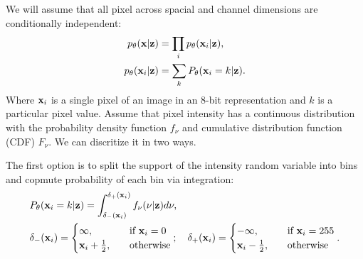 We will assume that all pixel across spacial and channel dimensions are conditionally independent:
\begin{align}
    p_{\theta}({\mathbf{x}}|{\mathbf{z}}) &= \prod_i p_{\theta}({\mathbf{x}}_i|{\mathbf{z}}),\\
    p_{\theta}({\mathbf{x}}_i|{\mathbf{z}}) &= \sum_{k} P_{\theta}({\mathbf{x}}_i = k|{\mathbf{z}}).
\end{align}
Where ${\mathbf{x}}_i$ is a single pixel of an image in an 8-bit representation and $k$ is a particular pixel value. 
Assume that pixel intensity has a continuous distribution with the probability density function $f_{\nu}$ and cumulative distribution function (CDF) $F_{\nu}$. We can discritize it in two ways. 

The first option is to split the support of the intensity random variable into bins and copmute probability of each bin via integration:
\begin{equation}\label{eq:intro_int_discr}
\begin{aligned}
    &P_{\theta}(\rvx_i = k|\rvz) = \int_{\delta_{-}(\rvx_i)}^{\delta_{+}(\rvx_i)} f_{\nu}(\nu|\rvz)d\nu,\\
    &\delta_{-}(\rvx_i) =
    \begin{cases}
        \infty,\quad &\text{if } \rvx_i = 0\\
        \rvx_i + \frac12,\quad&\text{otherwise}
    \end{cases};  \quad
    \delta_{+}(\rvx_i) =
    \begin{cases}
        -\infty,\quad &\text{if } \rvx_i = 255\\
        \rvx_i - \frac12,\quad&\text{otherwise}
    \end{cases}.
\end{aligned}
\end{equation}

